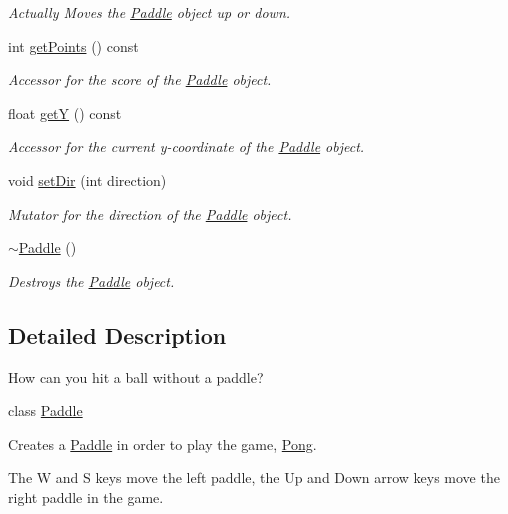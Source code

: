 \begin{DoxyCompactItemize}
\begin{DoxyCompactList}\small\item\em Actually Moves the \hyperlink{class_paddle}{Paddle} object up or down. \end{DoxyCompactList}\item 
int \hyperlink{class_paddle_a4425cbb3e6160de003c7fd364a9ad14b}{get\+Points} () const
\begin{DoxyCompactList}\small\item\em Accessor for the score of the \hyperlink{class_paddle}{Paddle} object. \end{DoxyCompactList}\item 
float \hyperlink{class_paddle_ab27981223156aa4a2b03203733514a6d}{getY} () const
\begin{DoxyCompactList}\small\item\em Accessor for the current y-\/coordinate of the \hyperlink{class_paddle}{Paddle} object. \end{DoxyCompactList}\item 
void \hyperlink{class_paddle_a5f23f811b810d1f4a84b25357bc86e94}{set\+Dir} (int direction)
\begin{DoxyCompactList}\small\item\em Mutator for the direction of the \hyperlink{class_paddle}{Paddle} object. \end{DoxyCompactList}\item 
\mbox{\label{class_paddle_ac03c6b92f0b9cd2e67edff4c318ad030}} 
\hyperlink{class_paddle_ac03c6b92f0b9cd2e67edff4c318ad030}{$\sim$\+Paddle} ()
\begin{DoxyCompactList}\small\item\em Destroys the \hyperlink{class_paddle}{Paddle} object. \end{DoxyCompactList}\end{DoxyCompactItemize}


\subsection{Detailed Description}
How can you hit a ball without a paddle? 

class \hyperlink{class_paddle}{Paddle}

Creates a \hyperlink{class_paddle}{Paddle} in order to play the game, \hyperlink{class_pong}{Pong}.

The W and S keys move the left paddle, the Up and Down arrow keys move the right paddle in the game.


